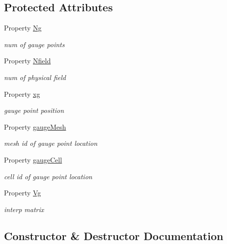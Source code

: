 \subsection*{Protected Attributes}
\begin{DoxyCompactItemize}
\item 
Property \hyperlink{class_abstract_analysis_af715cdbe228c7cd479c9d4fc362d956d}{Ng}
\begin{DoxyCompactList}\small\item\em num of gauge points \end{DoxyCompactList}\item 
Property \hyperlink{class_abstract_analysis_a0f64f43406510dbaa9689003375c0cf9}{Nfield}
\begin{DoxyCompactList}\small\item\em num of physical field \end{DoxyCompactList}\item 
Property \hyperlink{class_abstract_analysis_abaf0926252e93facb0590298a27f0ae6}{xg}
\begin{DoxyCompactList}\small\item\em gauge point position \end{DoxyCompactList}\item 
Property \hyperlink{class_abstract_analysis_ac7e8144eb8a0dd2a234bf60469c899df}{gauge\+Mesh}
\begin{DoxyCompactList}\small\item\em mesh id of gauge point location \end{DoxyCompactList}\item 
Property \hyperlink{class_abstract_analysis_a261e50d6b812a8fc4c6eb08578c46a92}{gauge\+Cell}
\begin{DoxyCompactList}\small\item\em cell id of gauge point location \end{DoxyCompactList}\item 
Property \hyperlink{class_abstract_analysis_a4e9418dfd5f4564c5b78179a0fb6e1bb}{Vg}
\begin{DoxyCompactList}\small\item\em interp matrix \end{DoxyCompactList}\end{DoxyCompactItemize}


\subsection{Constructor \& Destructor Documentation}
\mbox{\label{class_abstract_analysis_a05370192749aeff8a83230e3edb767af}} 
